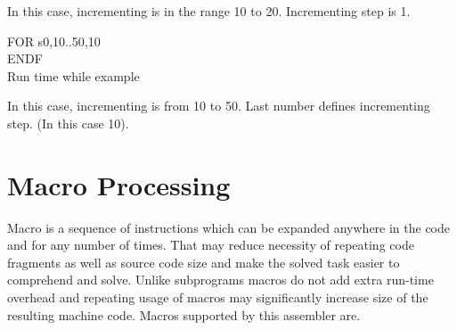             In this case, incrementing is in the range 10 to 20. Incrementing step is 1.
                    \begin{code}[h!]
                            { \color{highlight_directive} FOR  }
                            { \color{highlight_constant}   s0,10..50,10 }\\
                            { \color{highlight_directive}  ENDF}\\
                        \caption{Run time while example}
                    \end{code}
            In this case, incrementing is from 10 to 50. Last number defines incrementing step. (In this case 10).

    \section{Macro Processing}
        Macro is a sequence of instructions which can be expanded anywhere in the code and for any number of times. That may reduce necessity of
        repeating code fragments as well as source code size and make the solved task easier to comprehend and solve. Unlike subprograms macros do
        not add extra run-time overhead and repeating usage of macros may significantly increase size of the resulting machine code. Macros supported
        by this assembler are.


